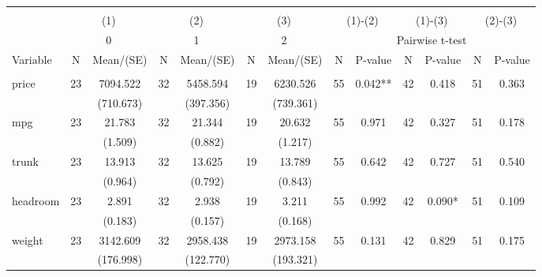 
\begin{tabular}{@{\extracolsep{5pt}}lcccccccccccc}
\\[-1.8ex]\hline \hline \\[-1.8ex]
 & \multicolumn{2}{c}{(1)}  & \multicolumn{2}{c}{(2)}  & \multicolumn{2}{c}{(3)}  & \multicolumn{2}{c}{(1)-(2)} & \multicolumn{2}{c}{(1)-(3)} & \multicolumn{2}{c}{(2)-(3)} \\
 & \multicolumn{2}{c}{0}  & \multicolumn{2}{c}{1}  & \multicolumn{2}{c}{2}  & \multicolumn{6}{c}{Pairwise t-test}  \\
Variable & N & Mean/(SE) & N & Mean/(SE) & N & Mean/(SE) & N & P-value & N & P-value & N & P-value \\ \hline \\[-1.8ex] 
price   & 23    & 7094.522    & 32    & 5458.594    & 19    & 6230.526    & 55    & 0.042**    & 42    & 0.418    & 51    & 0.363   \\
 &   & (710.673)  &   & (397.356)  &   & (739.361)  &   &  &   &  &   &  \\ [1ex]
mpg   & 23    & 21.783    & 32    & 21.344    & 19    & 20.632    & 55    & 0.971    & 42    & 0.327    & 51    & 0.178   \\
 &   & (1.509)  &   & (0.882)  &   & (1.217)  &   &  &   &  &   &  \\ [1ex]
trunk   & 23    & 13.913    & 32    & 13.625    & 19    & 13.789    & 55    & 0.642    & 42    & 0.727    & 51    & 0.540   \\
 &   & (0.964)  &   & (0.792)  &   & (0.843)  &   &  &   &  &   &  \\ [1ex]
headroom   & 23    & 2.891    & 32    & 2.938    & 19    & 3.211    & 55    & 0.992    & 42    & 0.090*    & 51    & 0.109   \\
 &   & (0.183)  &   & (0.157)  &   & (0.168)  &   &  &   &  &   &  \\ [1ex]
weight   & 23    & 3142.609    & 32    & 2958.438    & 19    & 2973.158    & 55    & 0.131    & 42    & 0.829    & 51    & 0.175   \\
 &   & (176.998)  &   & (122.770)  &   & (193.321)  &   &  &   &  &   &  \\ [1ex]

\end{tabular}
